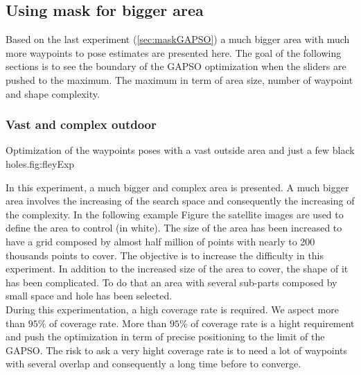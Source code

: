 	\subsection{Using mask for bigger area}
	Based on the last experiment (\ref{sec:maskGAPSO}) a much bigger area with much more waypoints to pose estimates are presented here. The goal of the following sections is to see the boundary of the  GAPSO optimization when the sliders are pushed to the maximum. The maximum in term of area size, number of waypoint and shape complexity.
	
		\subsubsection{Vast and complex outdoor}\label{sec:fey_map}

\begin{mfigures}[!]{ Optimization of the waypoints poses with a vast outside area and just a few  black holes.}{fig:fleyExp} \centering
{}
\hspace{1cm}
\hspace{1cm}
\tabsimuposeFley
\end{mfigures}


In this experiment, a much bigger and complex area is presented.
		A much bigger area involves the increasing of the search space and consequently the increasing of the complexity. 
In the following example Figure  the satellite images are used to define the area to control (in white). The size of the area has been increased to have a grid composed by almost half million of points with nearly to 200 thousands points to cover. 
The objective is to increase the difficulty in this experiment. In addition to the increased size of the area to cover, the shape of it has been complicated. To do that an area with several sub-parts composed by small space and hole has been selected.\\
During this experimentation, a high coverage rate is required. We aspect more than $95\%$ of coverage rate. More than $95\%$ of coverage rate is a hight requirement and push the optimization in term of precise positioning to the limit of the GAPSO. The risk to ask a very hight coverage rate is to need a lot of waypoints with several overlap and consequently a long time before to converge. 

